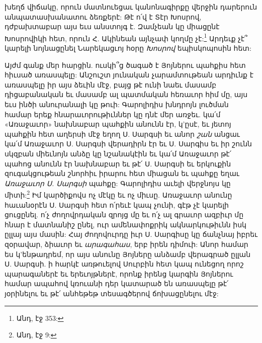 \documentclass{article}
\begin{document}
{խեղճ վիճակը, որուն մատնուեցաւ կանոնագիրքը վերջին դարերուն անպատասխանատու ձեռքերէ: Թէ ո՛վ է Տէր Խոսրով, դժբախտաբար այս եւս անստոյգ է. Զամչեան կը միացընէ Խոսրովիկի հետ, որուն Հ. Ակինեան այնչափ կողմը չէ:\footnote{Անդ, էջ 353:} Արդեւք չէ՞ կարելի նոյնացընել Նարեկացւոյ հօրը \emph{Խոսրով} եպիսկոպոսին հետ:

Այժմ գանք մեր հարցին. ուսկի՞ց ծագած է Յոյներու պահքիս հետ հիւսած առասպելը: Անշուշտ յունական չարամտութեան արդիւնք է առասպելը իր այս ձեւին մէջ, բայց թէ ունի նաեւ մասամբ դիցաբանական եւ մասամբ ալ պատմական հեռաւոր հիմ մը, այս եւս ինծի անուրանալի կը թուի: Գարոլիդիս խնդրոյն լուծման համար երեք հնարաւորութիւններ կը դնէ մեր առջեւ. կա՛մ «Առաջաւոր» նախնաբար պահքին անունն էր, կ'ըսէ, եւ յետոյ պահքին հետ աղերսի մէջ եղող Ս. Սարգսի եւ անոր \emph{շան} անցաւ կա՛մ Առաջաւոր Ս. Սարգսի վերադիրն էր եւ Ս. Սարգիս եւ իր շունն սկզբան միեւնոյն անձը կը նշանակէին եւ կա՛մ Առաջաւոր թէ՛ պահոց անունն էր նախնաբար եւ թէ՛ Ս. Սարգսի եւ երկուքին զուգակցութեան շնորհիւ իրարու հետ միացան եւ պահքը եղաւ \emph{Առաջաւոր Ս. Սարգսի} պահքը: Գարոլիդիս աւելի վերջնոյս կը միտի:\footnote{Անդ, էջ 9:} Իմ կարծիքովս ոչ մէկը եւ ոչ միւսը. Առաջաւոր անունը հաւանօրէն Ս. Սարգսի հետ ո՛րեւէ կապ չունի, գէթ չէ կարելի ցուցընել. ո՛չ ժողովրդական զրոյց մը եւ ո՛չ ալ գրաւոր ազբիւր մը հնար է մատնանիշ ընել, ուր ամենափոքրիկ ակնարկութիւնն իսկ ըլլայ այս մասին: Հայ ժողովուրդը իւր Ս. Սարգիսը կը ճանչնայ իբրեւ զօրավար, ձիաւոր եւ \emph{արագահաս}, երբ իրեն դիմուի: Անոր համար ես կ'ենթադրեմ, որ այս անունը Յոյները անձամբ վերագրած ըլլան Ս. Սարգսի. ի հարկէ առթուելով Սուրբին հետ կապ ունեցող որոշ պարագաներէ եւ երեւոյթներէ, որոնք իրենց կարգին Յոյներու համար ապահով կռուանի դեր կատարած են առասպելը թէ՛ յօրինելու եւ թէ՛ անհեթեթ տեսագծերով ճոխացընելու մէջ:

}
\end{document}
